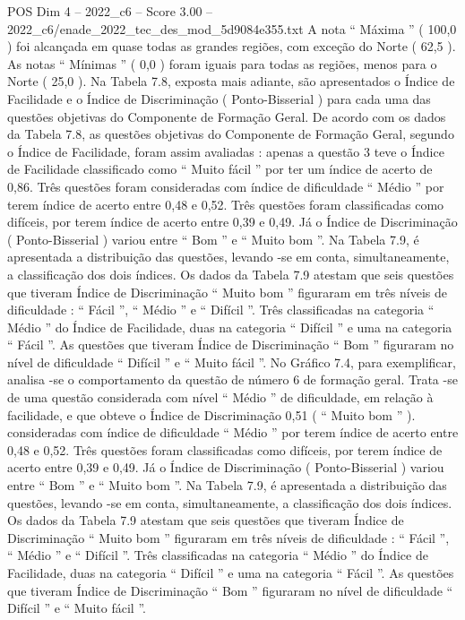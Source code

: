 \begin{textsample}{POS Dim 4 – 2022\_c6 – Score 3.00 – 2022\_c6/enade\_2022\_tec\_des\_mod\_5d9084e355.txt}
A nota “ Máxima ” ( 100,0 ) foi alcançada em quase todas as grandes regiões, com exceção do Norte ( 62,5 ).
As notas “ Mínimas ” ( 0,0 ) foram iguais para todas as regiões, menos para o Norte ( 25,0 ).
Na Tabela 7.8, exposta mais adiante, são apresentados o Índice de Facilidade e o Índice de Discriminação ( Ponto-Bisserial ) para cada uma das questões objetivas do Componente de Formação Geral.
De acordo com os dados da Tabela 7.8, as questões objetivas do Componente de Formação Geral, segundo o Índice de Facilidade, foram assim avaliadas : apenas a questão 3 teve o Índice de Facilidade classificado como “ Muito fácil ” por ter um índice de acerto de 0,86.
Três questões foram consideradas com índice de dificuldade “ Médio ” por terem índice de acerto entre 0,48 e 0,52.
Três questões foram classificadas como difíceis, por terem índice de acerto entre 0,39 e 0,49.
Já o Índice de Discriminação ( Ponto-Bisserial ) variou entre “ Bom ” e “ Muito bom ”.
Na Tabela 7.9, é apresentada a distribuição das questões, levando -se em conta, simultaneamente, a classificação dos dois índices.
Os dados da Tabela 7.9 atestam que seis questões que tiveram Índice de Discriminação “ Muito bom ” figuraram em três níveis de dificuldade : “ Fácil ”, “ Médio ” e “ Difícil ”.
Três classificadas na categoria “ Médio ” do Índice de Facilidade, duas na categoria “ Difícil ” e uma na categoria “ Fácil ”.
As questões que tiveram Índice de Discriminação “ Bom ” figuraram no nível de dificuldade “ Difícil ” e “ Muito fácil ”.
No Gráfico 7.4, para exemplificar, analisa -se o comportamento da questão de número 6 de formação geral.
Trata -se de uma questão considerada com nível “ Médio ” de dificuldade, em relação à facilidade, e que obteve o Índice de Discriminação 0,51 ( “ Muito bom ” ). consideradas com índice de dificuldade “ Médio ” por terem índice de acerto entre 0,48 e 0,52.
Três questões foram classificadas como difíceis, por terem índice de acerto entre 0,39 e 0,49.
Já o Índice de Discriminação ( Ponto-Bisserial ) variou entre “ Bom ” e “ Muito bom ”.
Na Tabela 7.9, é apresentada a distribuição das questões, levando -se em conta, simultaneamente, a classificação dos dois índices.
Os dados da Tabela 7.9 atestam que seis questões que tiveram Índice de Discriminação “ Muito bom ” figuraram em três níveis de dificuldade : “ Fácil ”, “ Médio ” e “ Difícil ”.
Três classificadas na categoria “ Médio ” do Índice de Facilidade, duas na categoria “ Difícil ” e uma na categoria “ Fácil ”.
As questões que tiveram Índice de Discriminação “ Bom ” figuraram no nível de dificuldade “ Difícil ” e “ Muito fácil ”.

\end{textsample}
